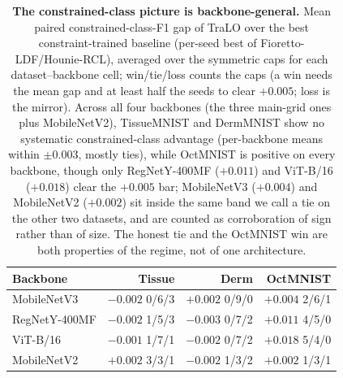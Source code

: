 \begin{table}[t]\centering\small
\setlength{\tabcolsep}{4.5pt}
\caption{\textbf{The constrained-class picture is backbone-general.} Mean paired
constrained-class-F1 gap of TraLO over the best constraint-trained baseline (per-seed best of
Fioretto-LDF/Hounie-RCL), averaged over the symmetric caps for each dataset--backbone cell;
{\scriptsize win/tie/loss} counts the caps (a win needs the mean gap and at least half the seeds
to clear $+0.005$; loss is the mirror). Across all four backbones (the three main-grid ones
plus MobileNetV2), TissueMNIST and DermMNIST show no systematic constrained-class advantage
(per-backbone means within $\pm0.003$, mostly ties), while OctMNIST is
{\color{blue}positive on every backbone, though only RegNetY-400MF ($+0.011$) and
ViT-B/16 ($+0.018$) clear the $+0.005$ bar; MobileNetV3 ($+0.004$) and MobileNetV2
($+0.002$) sit inside the same band we call a tie on the other two datasets, and are
counted as corroboration of sign rather than of size}.
The honest tie and the OctMNIST win are both properties of the regime, not of one architecture.}
\label{tab:bbgen}
\begin{tabular}{l rrr}
\toprule
Backbone & Tissue & Derm & OctMNIST \\
\midrule
MobileNetV3    & $-0.002$ {\scriptsize 0/6/3} & $+0.002$ {\scriptsize 0/9/0} & $+0.004$ {\scriptsize 2/6/1} \\
RegNetY-400MF  & $-0.002$ {\scriptsize 1/5/3} & $-0.003$ {\scriptsize 0/7/2} & $+0.011$ {\scriptsize 4/5/0} \\
ViT-B/16       & $-0.001$ {\scriptsize 1/7/1} & $-0.002$ {\scriptsize 0/7/2} & $+0.018$ {\scriptsize 5/4/0} \\
MobileNetV2    & $+0.002$ {\scriptsize 3/3/1} & $-0.002$ {\scriptsize 1/3/2} & $+0.002$ {\scriptsize 1/3/1} \\
\bottomrule
\end{tabular}
\end{table}
